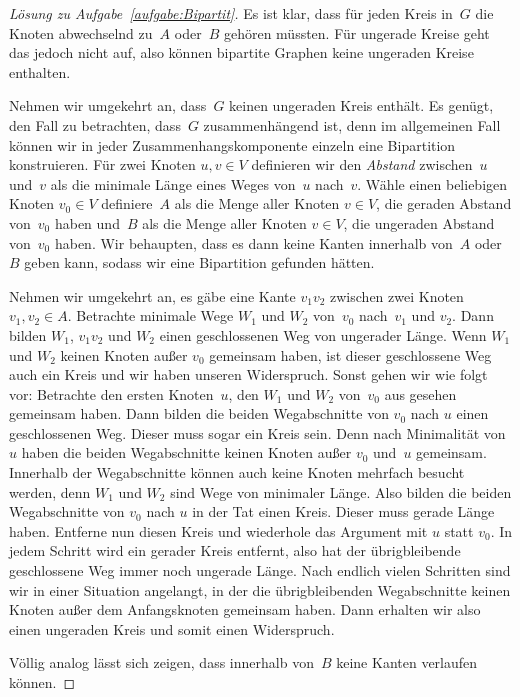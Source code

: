 \begin{proof}[Lösung zu Aufgabe~\ref{aufgabe:Bipartit}]
	Es ist klar, dass für jeden Kreis in~$G$ die Knoten abwechselnd zu~$A$ oder~$B$ gehören müssten. Für ungerade Kreise geht das jedoch nicht auf, also können bipartite Graphen keine ungeraden Kreise enthalten.
	
	Nehmen wir umgekehrt an, dass~$G$ keinen ungeraden Kreis enthält. Es genügt, den Fall zu betrachten, dass~$G$ zusammenhängend ist, denn im allgemeinen Fall können wir in jeder Zusammenhangskomponente einzeln eine Bipartition konstruieren. Für zwei Knoten $u,v\in V$ definieren wir den \emph{Abstand} zwischen~$u$ und~$v$ als die minimale Länge eines Weges von~$u$ nach~$v$. Wähle einen beliebigen Knoten $v_0\in V$ definiere~$A$ als die Menge aller Knoten $v\in V$, die geraden Abstand von~$v_0$ haben und~$B$ als die Menge aller Knoten $v\in V$, die ungeraden Abstand von~$v_0$ haben. Wir behaupten, dass es dann keine Kanten innerhalb von~$A$ oder~$B$ geben kann, sodass wir eine Bipartition gefunden hätten.
	
	Nehmen wir umgekehrt an, es gäbe eine Kante $v_1v_2$ zwischen zwei Knoten $v_1,v_2\in A$. Betrachte minimale Wege $W_1$ und $W_2$ von~$v_0$ nach~$v_1$ und $v_2$. Dann bilden $W_1$, $v_1v_2$ und $W_2$ einen geschlossenen Weg von ungerader Länge. Wenn $W_1$ und $W_2$ keinen Knoten außer $v_0$ gemeinsam haben, ist dieser geschlossene Weg auch ein Kreis und wir haben unseren Widerspruch. Sonst gehen wir wie folgt vor: Betrachte den ersten Knoten~$u$, den $W_1$ und $W_2$ von~$v_0$ aus gesehen gemeinsam haben. Dann bilden die beiden Wegabschnitte von $v_0$ nach $u$ einen geschlossenen Weg. Dieser muss sogar ein Kreis sein. Denn nach Minimalität von $u$ haben die beiden Wegabschnitte keinen Knoten außer $v_0$ und~$u$ gemeinsam. Innerhalb der Wegabschnitte können auch keine Knoten mehrfach besucht werden, denn $W_1$ und $W_2$ sind Wege von minimaler Länge. Also bilden die beiden Wegabschnitte von $v_0$ nach $u$ in der Tat einen Kreis. Dieser muss gerade Länge haben. Entferne nun diesen Kreis und wiederhole das Argument mit $u$ statt $v_0$. In jedem Schritt wird ein gerader Kreis entfernt, also hat der übrigbleibende geschlossene Weg immer noch ungerade Länge. Nach endlich vielen Schritten sind wir in einer Situation angelangt, in der die übrigbleibenden Wegabschnitte keinen Knoten außer dem Anfangsknoten gemeinsam haben. Dann erhalten wir also einen ungeraden Kreis und somit einen Widerspruch.
	
	Völlig analog lässt sich zeigen, dass innerhalb von~$B$ keine Kanten verlaufen können.
\end{proof}
